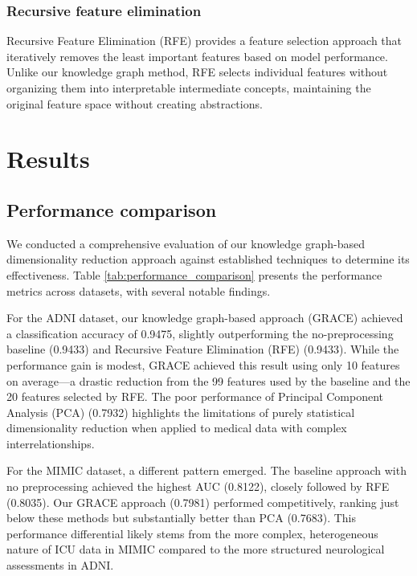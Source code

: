 \documentclass{article}
\begin{document}
\subsubsection{Recursive feature elimination}
Recursive Feature Elimination (RFE) provides a feature selection approach that iteratively removes the least important features based on model performance. Unlike our knowledge graph method, RFE selects individual features without organizing them into interpretable intermediate concepts, maintaining the original feature space without creating abstractions. 

\section{Results}

\subsection{Performance comparison}

We conducted a comprehensive evaluation of our knowledge graph-based dimensionality reduction approach against established techniques to determine its effectiveness. Table \ref{tab:performance_comparison} presents the performance metrics across datasets, with several notable findings.



For the ADNI dataset, our knowledge graph-based approach (GRACE) achieved a classification accuracy of 0.9475, slightly outperforming the no-preprocessing baseline (0.9433) and Recursive Feature Elimination (RFE) (0.9433). While the performance gain is modest, GRACE achieved this result using only 10 features on average—a drastic reduction from the 99 features used by the baseline and the 20 features selected by RFE. The poor performance of Principal Component Analysis (PCA) (0.7932) highlights the limitations of purely statistical dimensionality reduction when applied to medical data with complex interrelationships.

For the MIMIC dataset, a different pattern emerged. The baseline approach with no preprocessing achieved the highest AUC (0.8122), closely followed by RFE (0.8035). Our GRACE approach (0.7981) performed competitively, ranking just below these methods but substantially better than PCA (0.7683). This performance differential likely stems from the more complex, heterogeneous nature of ICU data in MIMIC compared to the more structured neurological assessments in ADNI.
\end{document}
